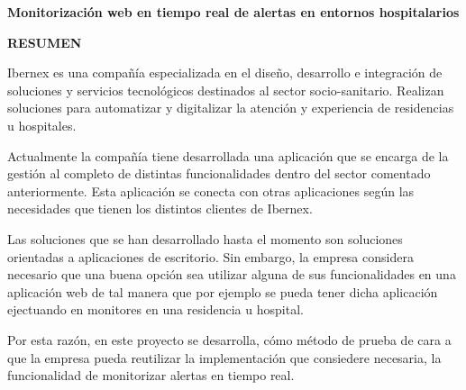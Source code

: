 \begin{center}
{\Large \bfseries Monitorización web en tiempo real de alertas en entornos hospitalarios}

\vspace{1cm}
{\Large \bfseries RESUMEN}

\end{center}


Ibernex es una compañía especializada en el diseño, desarrollo e integración de soluciones y servicios tecnológicos destinados al sector socio-sanitario.
Realizan soluciones para automatizar y digitalizar la atención y experiencia de residencias u hospitales. \newline

Actualmente la compañía tiene desarrollada una aplicación que se encarga de la gestión al completo de distintas funcionalidades dentro del sector comentado anteriormente. Esta aplicación se conecta con otras aplicaciones según las necesidades que tienen los distintos clientes de Ibernex. \newline

Las soluciones que se han desarrollado hasta el momento son soluciones orientadas a aplicaciones de escritorio. Sin embargo, la empresa considera necesario que una buena opción sea utilizar alguna de sus funcionalidades en una aplicación web de tal manera que por ejemplo se pueda tener dicha aplicación ejectuando en monitores en una residencia u hospital. \newline

Por esta razón, en este proyecto se desarrolla, cómo método de prueba de cara a que la empresa pueda reutilizar la implementación que consiedere necesaria, la funcionalidad de monitorizar alertas en tiempo real.

